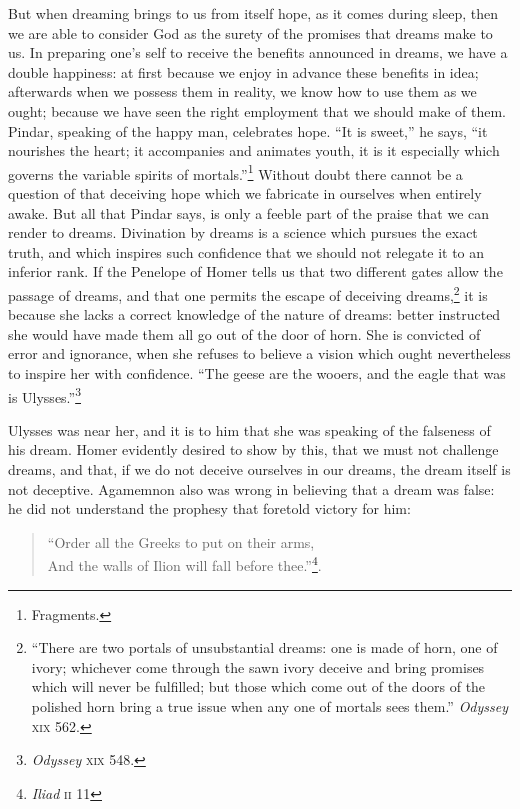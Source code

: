 \documentclass[12pt]{article}
\begin{document}
But when dreaming brings to us from itself hope, as it comes during sleep, then
we are able to consider God as the surety of the promises that dreams make to
us. In preparing one's self to receive the benefits announced in dreams, we
have a double happiness: at first because we enjoy in advance these benefits in
idea; afterwards when we possess them in reality, we know how to use them as we
ought; because we have seen the right employment that we should make of them.
Pindar, speaking of the happy man, celebrates hope. ``It is sweet,'' he says,
``it nourishes the heart; it accompanies and animates youth, it is it
especially which governs the variable spirits of
mortals.''\footnote{Fragments.} Without doubt there cannot be a question of
that deceiving hope which we fabricate in ourselves when entirely awake. But
all that Pindar says, is only a feeble part of the praise that we can render to
dreams. Divination by dreams is a science which pursues the exact truth, and
which inspires such confidence that we should not relegate it to an inferior
rank. If the Penelope of Homer tells us that two different gates allow the
passage of dreams, and that one permits the escape of deceiving
dreams,\footnote{``There are two portals of unsubstantial dreams: one is made
of horn, one of ivory; whichever come through the sawn ivory deceive and bring
promises which will never be fulfilled; but those which come out of the doors
of the polished horn bring a true issue when any one of mortals sees them.''
\textit{Odyssey} \textsc{xix} 562.} it is because she lacks a correct knowledge
of the nature of dreams: better instructed she would have made them all go out
of the door of horn. She is convicted of error and ignorance, when she refuses
to believe a vision which ought nevertheless to inspire her with confidence.
``The geese are the wooers, and the eagle that was is
Ulysses.''\footnote{\textit{Odyssey} \textsc{xix} 548.}

Ulysses was near her, and it is to him that she was speaking of the falseness
of his dream. Homer evidently desired to show by this, that we must not
challenge dreams, and that, if we do not deceive ourselves in our dreams, the
dream itself is not deceptive. Agamemnon also was wrong in believing that a
dream was false: he did not understand the prophesy that foretold victory for
him:

\begin{verse}
``Order all the Greeks to put on their arms,\\
And the walls of Ilion will fall before thee.''\footnote{\textit{Iliad}
\textsc{ii} 11}.
\end{verse}
\end{document}
